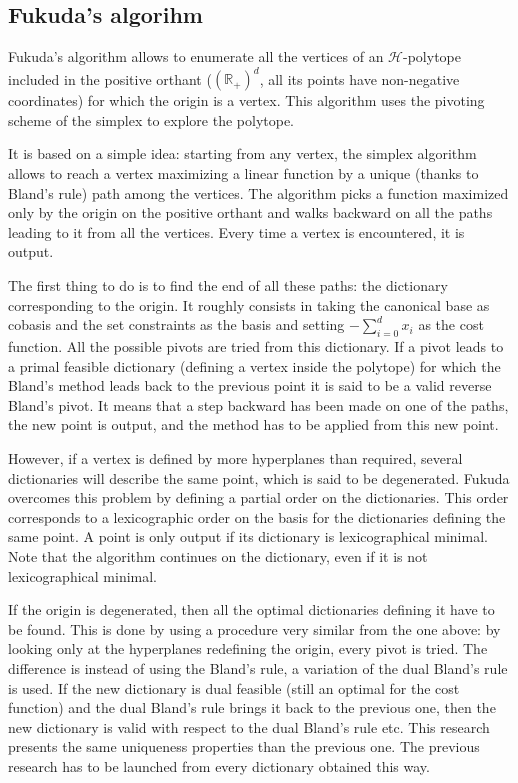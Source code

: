 \subsection{Fukuda's algorihm}

Fukuda's algorithm allows to enumerate all the vertices of an $\mathcal{H}$-polytope included in the positive orthant ($(\mathbb{R}_+)^d$, all its points have non-negative coordinates) for which the origin is a vertex. This algorithm uses the pivoting scheme of the simplex to explore the polytope. 

It is based on a simple idea: starting from any vertex, the simplex algorithm allows to reach a vertex maximizing a linear function by a unique (thanks to Bland's rule) path among the vertices. The algorithm picks a function maximized only by the origin on the positive orthant and walks backward on all the paths leading to it from all the vertices. Every time a vertex is encountered, it is output.

The first thing to do is to find the end of all these paths: the dictionary corresponding to the origin. It roughly consists in taking the canonical base as cobasis and the set constraints as the basis and setting $-\sum_{i=0}^d x_i$ as the cost function. All the possible pivots are tried from this dictionary. If a pivot leads to a primal feasible dictionary (defining a vertex inside the polytope) for which the Bland's method leads back to the previous point it is said to be a valid reverse Bland's pivot. It means that a step backward has been made on one of the paths, the new point is output, and the method has to be applied from this new point.

However, if a vertex is defined by more hyperplanes than required, several dictionaries will describe the same point, which is said to be degenerated. Fukuda overcomes this problem by defining a partial order on the dictionaries. This order corresponds to a lexicographic order on the basis for the dictionaries defining the same point. A point is only output if its dictionary is lexicographical minimal. Note that the algorithm continues on the dictionary, even if it is not lexicographical minimal.

If the origin is degenerated, then all the optimal dictionaries defining it have to be found. This is done by using a procedure very similar from the one above: by looking only at the hyperplanes redefining the origin, every pivot is tried. The difference is instead of using the Bland's rule, a variation of the dual Bland's rule is used. If the new dictionary is dual feasible (still an optimal for the cost function) and the dual Bland's rule brings it back to the previous one, then the new dictionary is valid with respect to the dual Bland's rule etc. This research presents the same uniqueness properties than the previous one. The previous research has to be launched from every dictionary obtained this way.

